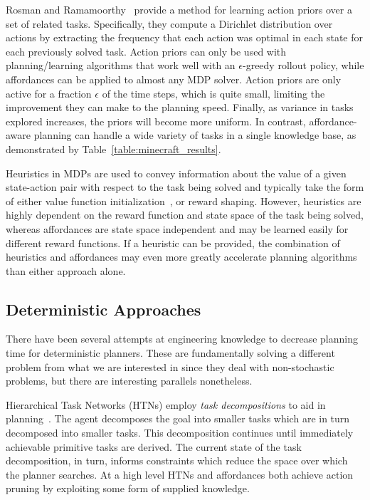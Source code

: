 \documentclass[letterpaper]{article}
\begin{document}
Rosman and Ramamoorthy~\cite{rosman2012good} provide a method for
learning action priors over a set of related tasks. Specifically, they
compute a Dirichlet distribution over actions by extracting the
frequency that each action was optimal in each state for each
previously solved task.  Action priors can only be used with
planning/learning algorithms that work well with an $\epsilon$-greedy
rollout policy, while affordances can be applied to almost any MDP
solver.  Action priors are only active for a fraction $\epsilon$ of
the time steps, which is quite small, limiting the improvement they
can make to the planning speed.  Finally, as variance in tasks
explored increases, the priors will become more uniform. In contrast,
affordance-aware planning can handle a wide variety of tasks in a
single knowledge base, as demonstrated by
Table~\ref{table:minecraft_results}.


Heuristics in MDPs are used to convey information about the value of a
given state-action pair with respect to the task being solved and
typically take the form of either value function
initialization~\citep{Hansen:1999qf}, or reward shaping\cite{potshap}.
However, heuristics are highly dependent on the reward function and
state space of the task being solved, whereas affordances are state
space independent and may be learned easily for different reward
functions. If a heuristic can be provided, the combination of
heuristics and affordances may even more greatly accelerate planning
algorithms than either approach alone.

\subsection{Deterministic Approaches}

There have been several attempts at engineering knowledge
to decrease planning time for deterministic planners. These are
fundamentally solving a different problem from what we are interested
in since they deal with non-stochastic problems, but there are
interesting parallels nonetheless.


Hierarchical Task Networks (HTNs) employ \textit{task decompositions}
to aid in planning~\cite{erol1994htn}. The agent decomposes the goal
into smaller tasks which are in turn decomposed into smaller
tasks. This decomposition continues until immediately achievable
primitive tasks are derived. The current state of the task
decomposition, in turn, informs constraints which reduce the space
over which the planner searches. At a high level HTNs and affordances
both achieve action pruning by exploiting some form of supplied
knowledge.
\end{document}

